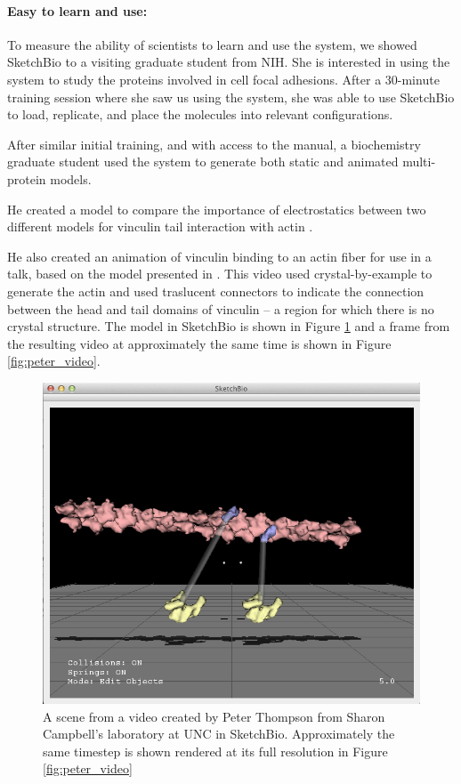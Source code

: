 \documentclass[twocolumn]{bmcart}%
\begin{document}
\paragraph*{Easy to learn and use:}
To measure the ability of scientists to learn and use the system, we showed SketchBio to a visiting graduate student from NIH.  She is interested in using the system to study the proteins involved in cell focal adhesions.
After a 30-minute training session where she saw us using the system, she was able to use SketchBio to load, replicate, and place the molecules into relevant configurations.

After similar initial training, and with access to the manual, a biochemistry graduate student used the system to generate both static and animated multi-protein models.

He created a model to compare the importance of electrostatics between two different models for vinculin tail interaction with actin \cite{janssen2006three}\cite{thompson2014identification}.

He also created an animation of vinculin binding to an actin fiber for use in a talk, based on the model presented in \cite{thievessen2013vinculin}.
This video used crystal-by-example to generate the actin and used traslucent connectors to indicate the connection between the head and tail domains of vinculin -- a region for which there is no crystal structure.
The model in SketchBio is shown in Figure \ref{fig:peter_model} and a frame from the resulting video at approximately the same time is shown in Figure \ref{fig:peter_video}.

\begin{figure}[h]
\centering
\includegraphics[width=0.9\columnwidth]{peter_model.png}
\caption{A scene from a video created by Peter Thompson from Sharon Campbell's laboratory at UNC  in SketchBio.
Approximately the same timestep is shown rendered at its full resolution in Figure \ref{fig:peter_video}}
\label{fig:peter_model}
\end{figure}
\end{document}
